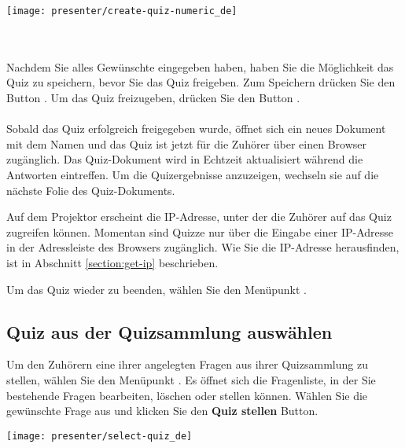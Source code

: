 \begin{minipage}{0.9\textwidth}
	\centering
	\captionsetup{type=figure}
	\texttt{[image: presenter/create-quiz-numeric\_de]}
  	\label{fig:numeric-quiz}
\end{minipage}
\\\\
Nachdem Sie alles Gewünschte eingegeben haben, haben Sie die Möglichkeit das Quiz zu speichern, bevor Sie das Quiz freigeben. Zum Speichern drücken Sie den Button . Um das Quiz freizugeben, drücken Sie den Button .
\\\\
Sobald das Quiz erfolgreich freigegeben wurde, öffnet sich ein neues Dokument mit dem Namen  und das Quiz ist jetzt für die Zuhörer über einen Browser zugänglich.
Das Quiz-Dokument wird in Echtzeit aktualisiert während die Antworten eintreffen. Um die Quizergebnisse anzuzeigen, wechseln sie auf die nächste Folie des Quiz-Dokuments.

Auf dem Projektor erscheint die IP-Adresse, unter der die Zuhörer auf das Quiz zugreifen können. Momentan sind Quizze nur über die Eingabe einer IP-Adresse in der Adressleiste des Browsers zugänglich. Wie Sie die IP-Adresse herausfinden, ist in Abschnitt \ref{section:get-ip} beschrieben.

Um das Quiz wieder zu beenden, wählen Sie den Menüpunkt .


\subsection{Quiz aus der Quizsammlung auswählen}
\label{section:select-quiz}
Um den Zuhörern eine ihrer angelegten Fragen aus ihrer Quizsammlung zu stellen, wählen Sie den Menüpunkt . Es öffnet sich die Fragenliste, in der Sie bestehende Fragen bearbeiten, löschen oder stellen können. Wählen Sie die gewünschte Frage aus und klicken Sie den \textbf{Quiz stellen} Button.

\begin{minipage}{0.9\textwidth}
	\centering
	\captionsetup{type=figure}
	\texttt{[image: presenter/select-quiz\_de]}
  	\label{fig:select-quiz}
\end{minipage}


